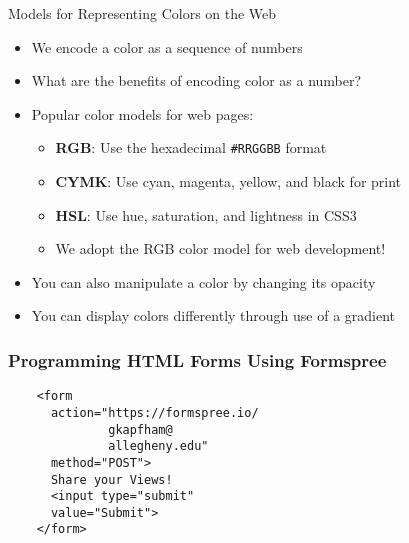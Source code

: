 \documentclass[14pt,aspectratio=169]{beamer}
\begin{document}
%
\begin{frame}{Models for Representing Colors on the Web}
  \begin{itemize}
    \item We encode a color as a sequence of numbers
      \vspace*{-.2in}
    \item What are the benefits of encoding color as a number?
      \vspace*{-.2in}
    \item Popular color models for web pages:
      \begin{itemize}
        \item {\bf RGB}: Use the hexadecimal {\tt \#RRGGBB} format
        \item {\bf CYMK}: Use cyan, magenta, yellow, and black for print
        \item {\bf HSL}: Use hue, saturation, and lightness in CSS3
        \item We adopt the RGB color model for web development!
      \end{itemize}
      \vspace*{-.25in}
    \item You can also manipulate a color by changing its opacity
      \vspace*{-.25in}
    \item You can display colors differently through use of a gradient
  \end{itemize}
\end{frame}

%
\begin{frame}[fragile]
  \frametitle{Programming HTML Forms Using Formspree}
  \normalsize
  \begin{minipage}{6in}
    \vspace*{.1in}
    \begin{verbatim}
    <form
      action="https://formspree.io/
              gkapfham@
              allegheny.edu"
      method="POST">
      Share your Views!
      <input type="submit"
      value="Submit">
    </form>
    \end{verbatim}
  \end{minipage}
\end{frame}
\end{document}
